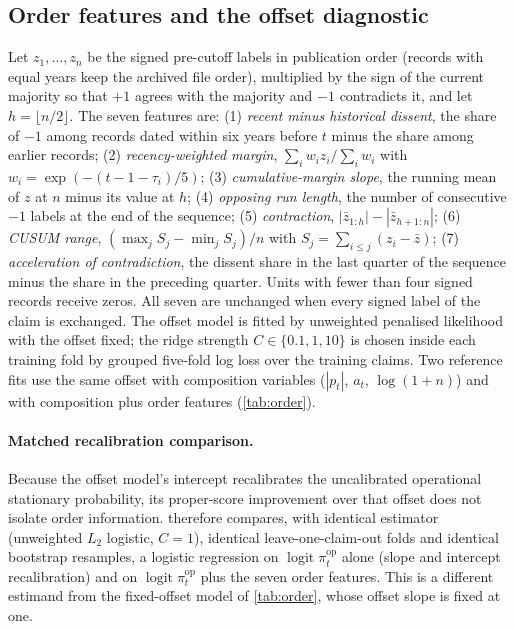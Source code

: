 \documentclass[11pt]{article}
\DeclareMathOperator{\logit}{logit}
\begin{document}
\subsection{Order features and the offset diagnostic}
\label{app:order}
Let $z_1,\ldots,z_n$ be the signed pre-cutoff labels in publication order (records with equal
years keep the archived file order), multiplied by the sign of the current majority so that $+1$
agrees with the majority and $-1$ contradicts it, and let $h=\lfloor n/2\rfloor$. The seven
features are: (1) \emph{recent minus historical dissent}, the share of $-1$ among records dated
within six years before $t$ minus the share among earlier records; (2) \emph{recency-weighted
margin}, $\sum_i w_i z_i/\sum_i w_i$ with $w_i=\exp(-(t-1-\tau_i)/5)$; (3)
\emph{cumulative-margin slope}, the running mean of $z$ at $n$ minus its value at $h$; (4)
\emph{opposing run length}, the number of consecutive $-1$ labels at the end of the sequence; (5)
\emph{contraction}, $|\bar z_{1:h}|-|\bar z_{h+1:n}|$; (6) \emph{CUSUM range},
$(\max_j S_j-\min_j S_j)/n$ with $S_j=\sum_{i\le j}(z_i-\bar z)$; (7) \emph{acceleration of
contradiction}, the dissent share in the last quarter of the sequence minus the share in the
preceding quarter. Units with fewer than four signed records receive zeros. All seven are
unchanged when every signed label of the claim is exchanged. The offset model is fitted by
unweighted penalised likelihood with the offset fixed; the ridge strength $C\in\{0.1,1,10\}$ is
chosen inside each training fold by grouped five-fold log loss over the training claims. Two
reference fits use the same offset with composition variables ($|p_t|$, $a_t$, $\log(1+n)$) and
with composition plus order features (\cref{tab:order}).

\paragraph{Matched recalibration comparison.} Because the offset model's intercept recalibrates the
uncalibrated operational stationary probability, its proper-score improvement over that offset
does not isolate order information.  therefore compares, with identical estimator (unweighted
$L_2$ logistic, $C=1$), identical leave-one-claim-out folds and identical bootstrap resamples, a
logistic regression on $\logit\pi^{\mathrm{op}}_t$ alone (slope and intercept recalibration) and
on $\logit\pi^{\mathrm{op}}_t$ plus the seven order features. This is a different estimand from the
fixed-offset model of \cref{tab:order}, whose offset slope is fixed at one.
\end{document}
